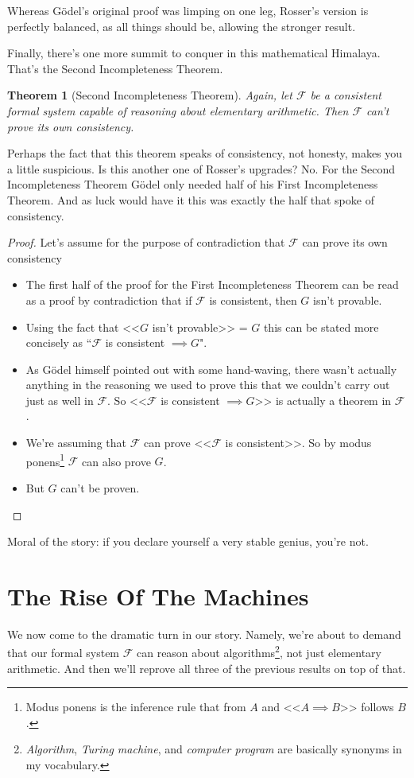 \documentclass{article}
\newtheorem{theorem}{Theorem}
\newcommand{\impl}{\item[$\Rightarrow$]}
\newcommand{\F}{\ensuremath{\mathcal{F}}}
\begin{document}
Whereas Gödel's original proof was limping on one leg, Rosser's version is perfectly balanced, as all things should be, allowing the stronger result.

Finally, there's one more summit to conquer in this mathematical Himalaya. That's the Second Incompleteness Theorem.

\begin{theorem}[Second Incompleteness Theorem]
Again, let $\F$ be a consistent formal system capable of reasoning about elementary arithmetic. Then $\F$ can't prove its own consistency.
\end{theorem}

Perhaps the fact that this theorem speaks of consistency, not honesty, makes you a little suspicious. Is this another one of Rosser's upgrades? No. For the Second Incompleteness Theorem Gödel only needed half of his First Incompleteness Theorem. And as luck would have it this was exactly the half that spoke of consistency.

\begin{proof}
Let's assume for the purpose of contradiction that $\F$ can prove its own consistency
\begin{itemize}
\impl The first half of the proof for the First Incompleteness Theorem can be read as a proof by contradiction that if $\F$ is consistent, then $G$ isn't provable.
\impl Using the fact that <<$G$ isn't provable>> = $G$ this can be stated more concisely as ``$\F$ is consistent $\implies G$".
\impl As Gödel himself pointed out with some hand-waving, there wasn't actually anything in the reasoning we used to prove this that we couldn't carry out just as well in $\F$. So <<$\F$ is consistent $\implies G$>> is actually a theorem in $\F$.
\impl We're assuming that $\F$ can prove <<$\F$ is consistent>>. So by modus ponens\footnote{Modus ponens is the inference rule that from $A$ and <<$A \implies B$>> follows $B$.} $\F$ can also prove $G$.
\impl But $G$ can't be proven. \lightning
\end{itemize}
\end{proof}

Moral of the story: if you declare yourself a very stable genius, you're not.\cite{trump}

\section{The Rise Of The Machines}

We now come to the dramatic turn in our story. Namely, we're about to demand that our formal system $\F$ can reason about algorithms\footnote{\textit{Algorithm}, \textit{Turing machine}, and \textit{computer program} are basically synonyms in my vocabulary.}, not just elementary arithmetic. And then we'll reprove all three of the previous results on top of that.
\end{document}

